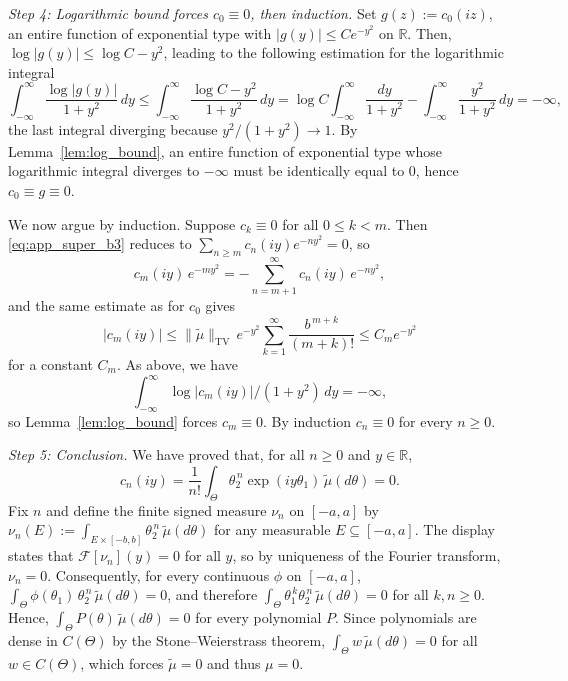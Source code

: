 \documentclass[11pt,twoside]{article} %
\begin{document}
\emph{Step 4: Logarithmic bound forces $c_0\equiv0$, then induction.}
Set $g(z):=c_0(iz)$, an entire function of exponential type with $|g(y)|\le Ce^{-y^2}$ on $\mathbb R$. Then,
$\log|g(y)|\le\log C-y^2$, leading to the following estimation for the logarithmic integral
\begin{equation*}
    \int_{-\infty}^\infty\frac{\log|g(y)|}{1+y^2}\,dy
    \le\int_{-\infty}^\infty\frac{\log C-y^2}{1+y^2}\,dy
    =\log C\int_{-\infty}^\infty\frac{dy}{1+y^2}-\int_{-\infty}^\infty\frac{y^2}{1+y^2}\,dy=-\infty,
\end{equation*}
the last integral diverging because $y^2/(1+y^2)\to1$. By Lemma~\ref{lem:log_bound}, an entire function of
exponential type whose logarithmic integral diverges to $-\infty$ must be identically equal to 0, hence $c_0\equiv g\equiv0$.

We now argue by induction. Suppose $c_k\equiv0$ for all $0\le k<m$. Then \eqref{eq:app_super_b3} reduces to
$\sum_{n\ge m}c_n(iy)e^{-ny^2}=0$, so
\begin{equation*}
    c_m(iy)\,e^{-my^2}=-\sum_{n=m+1}^\infty c_n(iy)\,e^{-ny^2},
\end{equation*}
and the same estimate as for $c_0$ gives
\begin{equation*}
    |c_m(iy)|\le\|\tilde\mu\|_{\mathrm{TV}}\,e^{-y^2}\sum_{k=1}^\infty\frac{b^{\,m+k}}{(m+k)!}\le C_me^{-y^2}
\end{equation*}
for a constant $C_m$. As above, we have 
\begin{equation*}
    \int_{-\infty}^\infty\log|c_m(iy)|/(1+y^2)\,dy=-\infty,
\end{equation*}
so Lemma~\ref{lem:log_bound} forces $c_m\equiv0$. By induction $c_n\equiv0$ for every $n\ge0$.

\emph{Step 5: Conclusion.}
We have proved that, for all $n\ge0$ and $y\in\mathbb R$,
\begin{equation*}
    c_n(iy)=\frac1{n!}\int_\Theta\theta_2^{\,n}\exp(iy\theta_1)\,\tilde\mu(d\theta)=0 .
\end{equation*}
Fix $n$ and define the finite signed measure $\nu_n$ on $[-a,a]$ by
$\nu_n(E):=\int_{E\times[-b,b]}\theta_2^{\,n}\,\tilde\mu(d\theta)$ for any measurable $E\subseteq[-a,a]$. The display
states that $\mathcal F[\nu_n](y)=0$ for all $y$, so by uniqueness of the Fourier transform, $\nu_n=0$.
Consequently, for every continuous $\phi$ on $[-a,a]$,
$\int_\Theta\phi(\theta_1)\,\theta_2^{\,n}\,\tilde\mu(d\theta)=0$, and therefore
$\int_\Theta \theta_1^{\,k}\theta_2^{\,n}\,\tilde\mu(d\theta)=0$ for all $k,n\ge0$. Hence,
$\int_\Theta P(\theta)\,\tilde\mu(d\theta)=0$ for every polynomial $P$. Since polynomials are dense in
$C(\Theta)$ by the Stone--Weierstrass theorem, $\int_\Theta w\,\tilde\mu(d\theta)=0$ for all $w\in C(\Theta)$,
which forces $\tilde\mu=0$ and thus $\mu=0$. %
\end{document}
